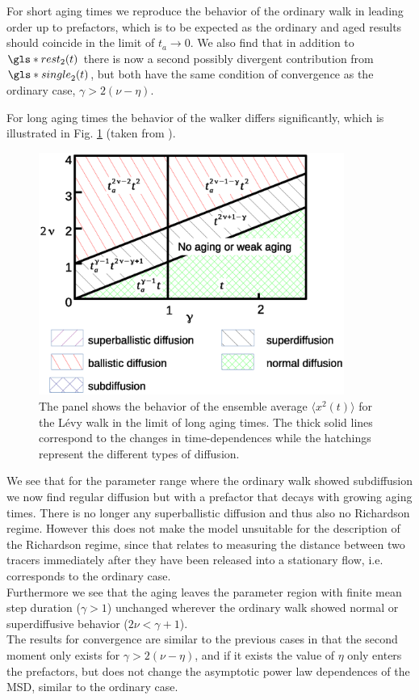 For short aging times we reproduce the behavior of the ordinary walk in leading order up to prefactors, which is to be expected as the ordinary and aged results should coincide in the limit of $t_a \to 0$. We also find that in addition to $\gls*{rest}_2(t)$ there is now a second possibly divergent contribution from $\gls*{single}_2(t)$, but both have the same condition of convergence as the ordinary case, $\gamma > 2(\nu-\eta)$. 

For long aging times the behavior of the walker differs significantly, which is illustrated in Fig. \ref{fig:resultsMSDaged} (taken from 
\cite{bothe}). 
%
\begin{figure}[h!]
\begin{center}
\includegraphics[width=100mm]{pics/resultsMSDaged.eps}
\caption{The panel shows the behavior of the ensemble average $\langle x^2(t) \rangle$ for the L\'evy walk in the limit of long aging times. The thick solid lines correspond to the changes in time-dependences while the hatchings represent the different types of diffusion.
\label{fig:resultsMSDaged} }
\end{center}
\end{figure} 
%
We see that for the parameter range where the ordinary walk showed subdiffusion we now find regular diffusion but with a prefactor that decays with growing aging times. There is no longer any superballistic diffusion and thus also no Richardson regime. However this does not make the model unsuitable for the description of the Richardson regime, since that relates to measuring the distance between two tracers immediately after they have been released into a stationary flow, i.e. corresponds to the ordinary case.\\ 
Furthermore we see that the aging leaves the parameter region with finite mean step duration ($\gamma>1$) unchanged wherever the ordinary walk showed normal or superdiffusive behavior ($2\nu < \gamma +1$).\\
The results for convergence are similar to the previous cases in that the second moment only exists for $\gamma>2(\nu-\eta)$, and if it exists the value of $\eta$ only enters the prefactors, but does not change the asymptotic power law dependences of the MSD, similar to the ordinary case.

